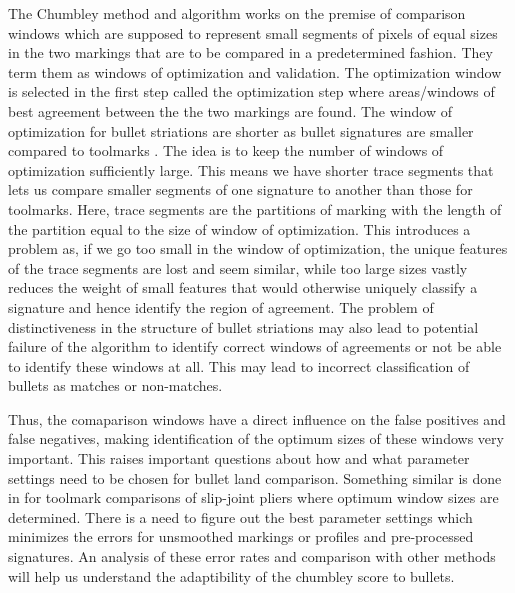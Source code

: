 \documentclass[12pt]{article}
\begin{document}
The Chumbley method and algorithm works on the premise of comparison
windows which are supposed to represent small segments of pixels of
equal sizes in the two markings that are to be compared in a
predetermined fashion. They term them as windows of optimization and
validation. The optimization window is selected in the first step called
the optimization step where areas/windows of best agreement between the
the two markings are found. The window of optimization for bullet
striations are shorter as bullet signatures are smaller compared to
toolmarks . The idea is to keep the number of windows of optimization
sufficiently large. This means we have shorter trace segments that lets
us compare smaller segments of one signature to another than those for
toolmarks. Here, trace segments are the partitions of marking with the
length of the partition equal to the size of window of optimization.
This introduces a problem as, if we go too small in the window of
optimization, the unique features of the trace segments are lost and
seem similar, while too large sizes vastly reduces the weight of small
features that would otherwise uniquely classify a signature and hence
identify the region of agreement. The problem of distinctiveness in the
structure of bullet striations may also lead to potential failure of the
algorithm to identify correct windows of agreements or not be able to
identify these windows at all. This may lead to incorrect classification
of bullets as matches or non-matches.

Thus, the comaparison windows have a direct influence on the false
positives and false negatives, making identification of the optimum
sizes of these windows very important. This raises important questions
about how and what parameter settings need to be chosen for bullet land
comparison. Something similar is done in \citet{afte-chumbley} for
toolmark comparisons of slip-joint pliers where optimum window sizes are
determined. There is a need to figure out the best parameter settings
which minimizes the errors for unsmoothed markings or profiles and
pre-processed signatures. An analysis of these error rates and
comparison with other methods will help us understand the adaptibility
of the chumbley score to bullets.
\end{document}
